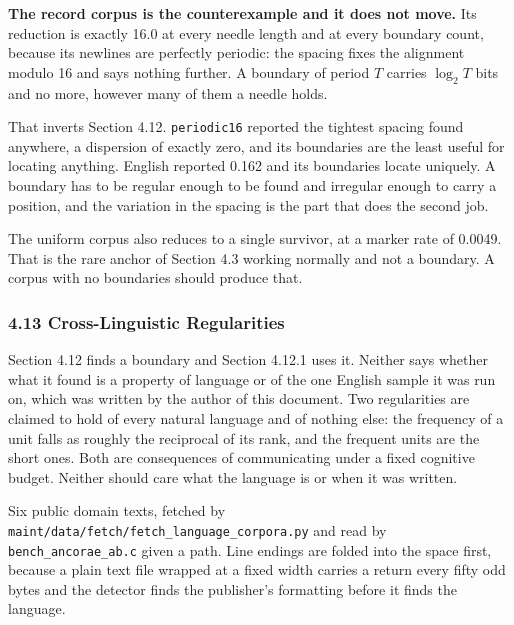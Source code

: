 \noindent\textbf{The record corpus is the counterexample and it does not move.} Its reduction is exactly 16.0 at every needle length and at every boundary count, because its newlines are perfectly periodic: the spacing fixes the alignment modulo 16 and says nothing further. A boundary of period \(T\) carries \(\log_2 T\) bits and no more, however many of them a needle holds.

That inverts Section 4.12. \texttt{periodic16} reported the tightest spacing found anywhere, a dispersion of exactly zero, and its boundaries are the least useful for locating anything. English reported 0.162 and its boundaries locate uniquely. A boundary has to be regular enough to be found and irregular enough to carry a position, and the variation in the spacing is the part that does the second job.

The uniform corpus also reduces to a single survivor, at a marker rate of 0.0049. That is the rare anchor of Section 4.3 working normally and not a boundary. A corpus with no boundaries should produce that.

\subsubsection{4.13 Cross-Linguistic Regularities}

Section 4.12 finds a boundary and Section 4.12.1 uses it. Neither says whether what it found is a property of language or of the one English sample it was run on, which was written by the author of this document. Two regularities are claimed to hold of every natural language and of nothing else: the frequency of a unit falls as roughly the reciprocal of its rank, and the frequent units are the short ones. Both are consequences of communicating under a fixed cognitive budget. Neither should care what the language is or when it was written.

Six public domain texts, fetched by \texttt{maint/\allowbreak{}data/\allowbreak{}fetch/\allowbreak{}fetch\_\allowbreak{}language\_\allowbreak{}corpora.\allowbreak{}py} and read by \texttt{bench\_\allowbreak{}ancorae\_\allowbreak{}ab.\allowbreak{}c} given a path. Line endings are folded into the space first, because a plain text file wrapped at a fixed width carries a return every fifty odd bytes and the detector finds the publisher's formatting before it finds the language.

